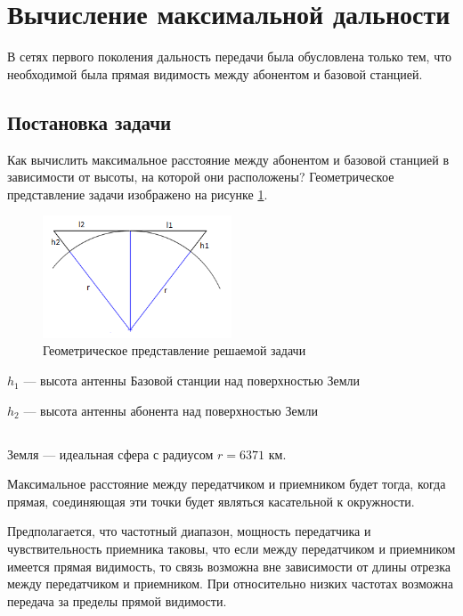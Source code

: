 \section{Вычисление максимальной дальности}
В сетях первого поколения дальность передачи была обусловлена только
тем, что необходимой была прямая видимость между абонентом
и базовой станцией.
\subsection{Постановка задачи}
Как вычислить максимальное расстояние между абонентом и базовой станцией в зависимости от высоты, на которой они расположены? Геометрическое представление задачи изображено на рисунке \ref{fig:img8}.

\begin{figure}[H]
	\centering
	\includegraphics[width=0.5\textwidth]{img/kich_bur/image8.png}
	\caption{Геометрическое представление решаемой задачи}
	\label{fig:img8}
\end{figure}

$ h_1 $ --- высота антенны Базовой станции над поверхностью Земли 

$ h_2 $ --- высота антенны абонента над поверхностью Земли 

\subsection{}
Земля --- идеальная сфера с радиусом $r = 6371$ км.

Максимальное расстояние между передатчиком и приемником будет тогда, когда прямая, соединяющая эти точки будет являться касательной к окружности. 

Предполагается, что частотный диапазон, мощность передатчика и чувствительность
приемника таковы, что если между передатчиком и приемником имеется
прямая видимость, то связь возможна вне зависимости от длины отрезка
между передатчиком и приемником. При относительно низких частотах
возможна передача за пределы прямой видимости. 

